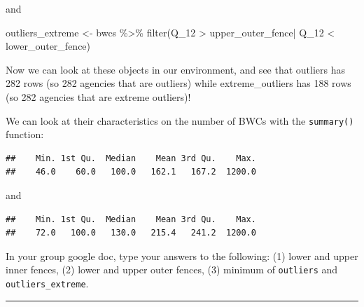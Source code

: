 \documentclass[
]{book}
\newenvironment{Shaded}{\begin{snugshade}}{\end{snugshade}}
\newcommand{\FunctionTok}[1]{\textcolor[rgb]{0.00,0.00,0.00}{#1}}
\newcommand{\NormalTok}[1]{#1}
\newcommand{\OtherTok}[1]{\textcolor[rgb]{0.56,0.35,0.01}{#1}}
\newcommand{\SpecialCharTok}[1]{\textcolor[rgb]{0.00,0.00,0.00}{#1}}
\begin{document}
and

\begin{Shaded}
\begin{Highlighting}[]
\NormalTok{outliers\_extreme }\OtherTok{\textless{}{-}}\NormalTok{ bwcs }\SpecialCharTok{\%\textgreater{}\%} 
  \FunctionTok{filter}\NormalTok{(Q\_12 }\SpecialCharTok{\textgreater{}}\NormalTok{ upper\_outer\_fence}\SpecialCharTok{|}\NormalTok{ Q\_12 }\SpecialCharTok{\textless{}}\NormalTok{ lower\_outer\_fence)}
\end{Highlighting}
\end{Shaded}

Now we can look at these objects in our environment, and see that outliers has 282 rows (so 282 agencies that are outliers) while extreme\_outliers has 188 rows (so 282 agencies that are extreme outliers)!

We can look at their characteristics on the number of BWCs with the \texttt{summary()} function:

\begin{Shaded}
\end{Shaded}

\begin{verbatim}
##    Min. 1st Qu.  Median    Mean 3rd Qu.    Max. 
##    46.0    60.0   100.0   162.1   167.2  1200.0
\end{verbatim}

and

\begin{Shaded}
\end{Shaded}

\begin{verbatim}
##    Min. 1st Qu.  Median    Mean 3rd Qu.    Max. 
##    72.0   100.0   130.0   215.4   241.2  1200.0
\end{verbatim}

In your group google doc, type your answers to the following: (1) lower and upper inner fences, (2) lower and upper outer fences, (3) minimum of \texttt{outliers} and \texttt{outliers\_extreme}.

\begin{center}\rule{0.5\linewidth}{0.5pt}\end{center}
\end{document}
